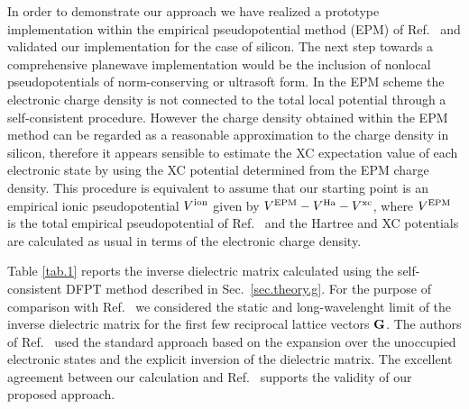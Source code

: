 \documentclass[twocolumn,prb,showpacs,superscriptaddress]{revtex4}
\def\G{{\bf G}}
\begin{document}
In order to demonstrate our approach we have realized a prototype implementation
within the empirical pseudopotential method (EPM) of Ref.\ 
and validated our implementation for the case of silicon. The next step towards
a comprehensive planewave implementation would be the inclusion of 
nonlocal pseudopotentials of norm-conserving\cite{ncpp} or ultrasoft\cite{uspp} 
form. In the EPM scheme the electronic charge density is not connected to
the total local potential through a self-consistent procedure.\cite{appelbaum} However
the charge density obtained within the EPM method can be regarded as 
a reasonable approximation to the charge density in silicon,\cite{EPM-density} therefore 
it appears sensible to estimate the XC expectation value of each electronic state
by using the XC potential determined from the EPM charge density.
This procedure is equivalent to assume that our starting point is
an empirical ionic pseudopotential $V^{\rm ion}$ given by
$V^{\rm EPM} - V^{\rm Ha} - V^{\rm xc}$, where
$V^{\rm EPM}$ is the total empirical pseudopotential of Ref.\ 
and the Hartree and XC potentials are calculated as usual
in terms of the electronic charge density.

Table \ref{tab.1} reports the inverse dielectric matrix calculated using
the self-consistent DFPT method described in Sec.~\ref{sec.theory.g}.
For the purpose of comparison with Ref.\  
we considered the static and long-wavelenght limit of the inverse dielectric matrix
for the first few reciprocal lattice vectors $\G$. 
The authors of Ref.\  used the standard approach based on the expansion over the
unoccupied electronic states and the explicit inversion of the dielectric matrix.
The excellent agreement between our calculation and Ref.~
supports the validity of our proposed approach.
\end{document}
